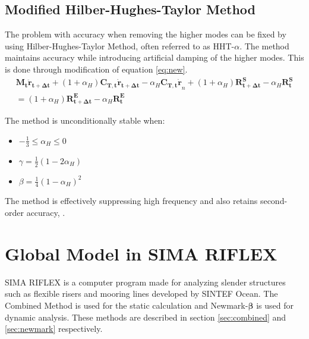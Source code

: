 \subsection{Modified Hilber-Hughes-Taylor Method}
\label{sec:HHT}
The problem with accuracy when removing the higher modes can be fixed by using Hilber-Hughes-Taylor Method, often referred to as HHT-$\alpha$. The method maintains accuracy while introducing artificial damping of the higher modes. This is done through modification of equation \ref{eq:new}. 
\begin{equation}
\begin{split}
   \boldsymbol{M_t \ddot{r}_{t+\Delta t}} + (1+\alpha_H)\boldsymbol{C_{T,t}\dot{r}_{t+\Delta t}}  -\alpha_H\boldsymbol{C_{T,t}\dot{r}}_{n}+ (1+\alpha_H)\boldsymbol{R_{t+\Delta t}^S}-\alpha_H\boldsymbol{R_{t}^S}\\=(1+\alpha_H) \boldsymbol{R_{t+\Delta t}^E}-\alpha_H\boldsymbol{R_{t}^E}
   \end{split}
\end{equation}

The method is unconditionally stable when:
\begin{itemize}
    \item $-\frac{1}{3} \leq \alpha_H \leq 0 $
    \item  $\gamma = \frac{1}{2} (1-2 \alpha_H)$
    \item  $\beta = \frac{1}{4} (1- \alpha_H)^2$
\end{itemize}

\noindent The method is effectively suppressing high frequency and also retains second-order accuracy, \cite{Mathisen1990}.

\section{Global Model in SIMA RIFLEX}
SIMA RIFLEX is a computer program made for analyzing slender structures such as flexible risers and mooring lines developed by SINTEF Ocean. The Combined Method is used for the static calculation and Newmark-$\boldsymbol{\beta}$ is used for dynamic analysis. These methods are described in section \ref{sec:combined} and \ref{sec:newmark} respectively. 


